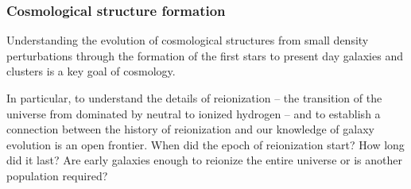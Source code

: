 
\vspace{-0.15in}

\subsubsection{Cosmological structure formation}

\vspace{-0.05in}

Understanding the evolution of cosmological structures from small density perturbations through the formation of the
first stars to present day galaxies and clusters is a key goal of cosmology.%

In particular, to understand the details of reionization -- the transition of the universe from dominated by neutral to ionized 
hydrogen -- and to establish a connection between the history of reionization and our knowledge of galaxy evolution is an open frontier. When did the epoch of reionization start?  How long did it last? Are early galaxies enough to reionize the entire universe or is another population required?


 
